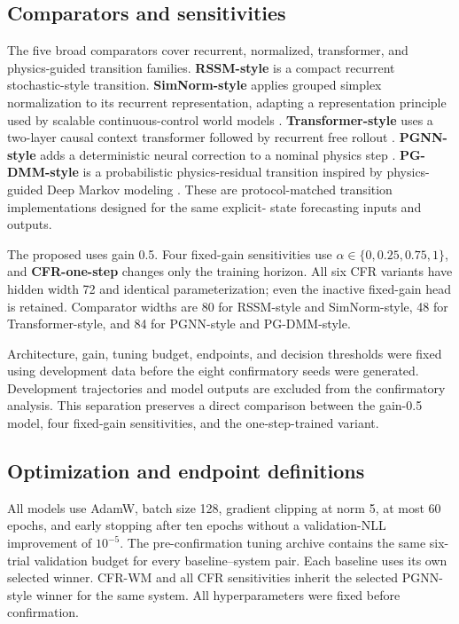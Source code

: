 \subsection{Comparators and sensitivities}

The five broad comparators cover recurrent, normalized, transformer, and
physics-guided transition families. \textbf{RSSM-style} is a compact recurrent
stochastic-style transition. \textbf{SimNorm-style} applies grouped simplex
normalization to its recurrent representation, adapting a representation
principle used by scalable continuous-control world models
\cite{hansen2023_td_mpc2_scalable_robust_world}. \textbf{Transformer-style} uses a
two-layer causal context transformer followed by recurrent free rollout
\cite{micheli2022_transformers_are_sample_efficient_world}. \textbf{PGNN-style}
adds a deterministic neural correction to a nominal physics step
\cite{robinson2022_physics_guided_neural_networks_for}. \textbf{PG-DMM-style} is a
probabilistic physics-residual transition inspired by physics-guided Deep
Markov modeling \cite{liu2022_physics_guided_deep_markov_models}. These are
protocol-matched transition implementations designed for the same explicit-
state forecasting inputs and outputs.

The proposed \textbf{\method} uses gain 0.5. Four fixed-gain sensitivities use
$\alpha\in\{0,0.25,0.75,1\}$, and \textbf{CFR-one-step} changes only the
training horizon. All six CFR variants have hidden width 72 and identical
parameterization; even the inactive fixed-gain head is retained. Comparator
widths are 80 for RSSM-style and SimNorm-style, 48 for Transformer-style, and
84 for PGNN-style and PG-DMM-style.

Architecture, gain, tuning budget, endpoints, and decision thresholds were
fixed using development data before the eight confirmatory seeds were
generated. Development trajectories and model outputs are excluded from the
confirmatory analysis. This separation preserves a direct comparison between
the gain-0.5 model, four fixed-gain sensitivities, and the one-step-trained
variant.

\subsection{Optimization and endpoint definitions}

All models use AdamW, batch size 128, gradient clipping at norm 5, at most 60
epochs, and early stopping after ten epochs without a validation-NLL
improvement of $10^{-5}$. The pre-confirmation tuning archive contains the same
six-trial validation budget for every baseline--system pair. Each baseline uses
its own selected winner. CFR-WM and all CFR sensitivities inherit the selected PGNN-style
winner for the same system. All hyperparameters were fixed before confirmation.

